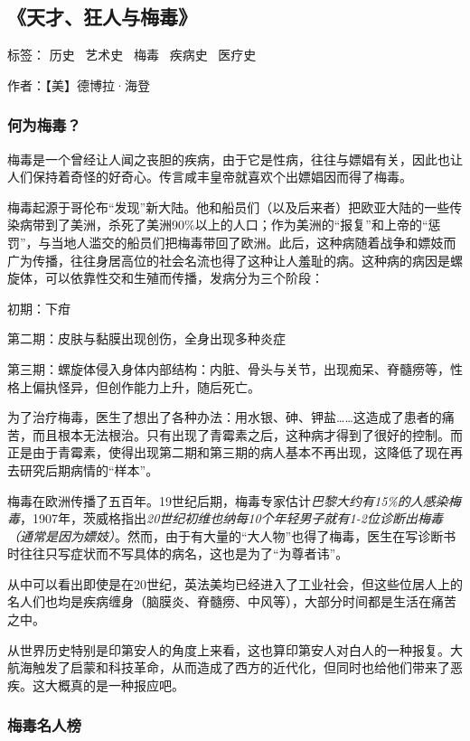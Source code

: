 \subsection{《天才、狂人与梅毒》}

标签： 历史 \  艺术史 \  梅毒 \  疾病史 \ 医疗史

作者：【美】德博拉·海登

\subsubsection{何为梅毒？}
梅毒是一个曾经让人闻之丧胆的疾病，由于它是性病，往往与嫖娼有关，因此也让人们保持着奇怪的好奇心。传言咸丰皇帝就喜欢个出嫖娼因而得了梅毒。

梅毒起源于哥伦布“发现”新大陆。他和船员们（以及后来者）把欧亚大陆的一些传染病带到了美洲，杀死了美洲90\%以上的人口；作为美洲的“报复”和上帝的“惩罚”，与当地人滥交的船员们把梅毒带回了欧洲。此后，这种病随着战争和嫖妓而广为传播，往往身居高位的社会名流也得了这种让人羞耻的病。这种病的病因是螺旋体，可以依靠性交和生殖而传播，发病分为三个阶段：
\begin{itemize*}
	\item 初期：下疳
	\item 第二期：皮肤与黏膜出现创伤，全身出现多种炎症
	\item 第三期：螺旋体侵入身体内部结构：内脏、骨头与关节，出现痴呆、脊髓痨等，性格上偏执怪异，但创作能力上升，随后死亡。
\end{itemize*}

为了治疗梅毒，医生了想出了各种办法：用水银、砷、钾盐……这造成了患者的痛苦，而且根本无法根治。只有出现了青霉素之后，这种病才得到了很好的控制。而正是由于青霉素，使得出现第二期和第三期的病人基本不再出现，这降低了现在再去研究后期病情的“样本”。

梅毒在欧洲传播了五百年。19世纪后期，梅毒专家估计\emph{巴黎大约有15\%的人感染梅毒}，1907年，茨威格指出\emph{20世纪初维也纳每10个年轻男子就有1-2位诊断出梅毒（通常是因为嫖妓）}。然而，由于有大量的“大人物”也得了梅毒，医生在写诊断书时往往只写症状而不写具体的病名，这也是为了“为尊者讳”。

从中可以看出即使是在20世纪，英法美均已经进入了工业社会，但这些位居人上的名人们也均是疾病缠身（脑膜炎、脊髓痨、中风等），大部分时间都是生活在痛苦之中。

从世界历史特别是印第安人的角度上来看，这也算印第安人对白人的一种报复。大航海触发了启蒙和科技革命，从而造成了西方的近代化，但同时也给他们带来了恶疾。这大概真的是一种报应吧。

\subsubsection{梅毒名人榜}

